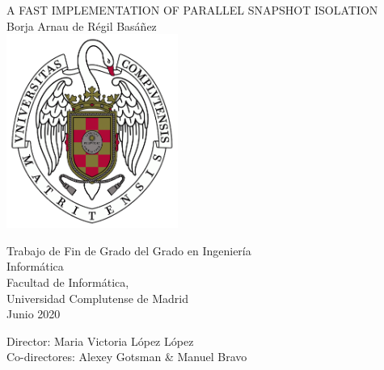 \newpage
\thispagestyle{empty}
\begin{center}
   \vspace{1cm}
   {\Large A FAST IMPLEMENTATION OF PARALLEL SNAPSHOT ISOLATION}\\
   \vspace{1cm}
   {\large Borja Arnau de Régil Basáñez}\\
   \vspace{0.85cm}
   \includegraphics[height=2.5in]{figures/escudo.png}

   \vspace{0.85cm}
   Trabajo de Fin de Grado del Grado en Ingeniería\\
   Informática\\

   \vspace{0.2cm}
   Facultad de Informática,\\
   Universidad Complutense de Madrid \\

   \vspace{1cm}
   Junio 2020
\end{center}

{\raggedleft
   \vspace{2cm}
   Director: Maria Victoria López López\\
   Co-directores: Alexey Gotsman \& Manuel Bravo\\
}
